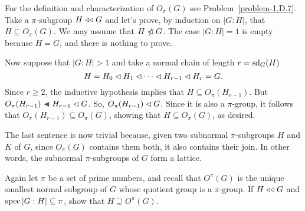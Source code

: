 \begin{solution}  For the definition and characterization of $O_\pi(G)$ see Problem~\ref{problem-1.D.7}. Take a $\pi$-subgroup $H\mathrel{\triangleleft\triangleleft} G$ and let's prove, by induction on $|G:H|$, that $H\subseteq O_\pi(G)$. We may assume that $H\nnormal G$. The case $|G:H|=1$ is empty because $H=G$, and there is nothing to prove.

Now suppose that $|G:H|>1$ and take a normal chain of length $r={\rm sd}_G(H)$
$$
    H = H_0\lhd H_1\lhd\cdots\lhd H_{r-1}\lhd H_r=G.
$$
Since $r\ge2$, the inductive hypothesis implies that $H\subseteq O_\pi(H_{r-1})$. But $O_\pi(H_{r-1})\ch H_{r-1}\normal G$. So, $O_\pi(H_{r-1})\lhd G$. Since it is also a $\pi$-group, it follows that $O_\pi(H_{r-1})\subseteq O_\pi(G)$, showing that $H\subseteq O_\pi(G)$, as desired.

The last sentence is now trivial because, given two subnormal $\pi$-subgroups $H$ and $K$ of $G$, since $O_\pi(G)$ contains them both, it also contains their join. In other words, the subnormal $\pi$-subgroups of $G$ form a lattice.  \end{solution}

\begin{probl}\label{problem-2.A.2}
    Again let $\pi$ be a set of prime numbers, and recall that $O^\pi(G)$ is the unique smallest normal subgroup of\/ $G$ whose quotient group is a $\pi$-group. If\/ $H\mathrel{\triangleleft\triangleleft} G$ and $\operatorname{spec}|G:H|\subseteq\pi$, show that $H\supseteq O^\pi(G)$.
\end{probl}

